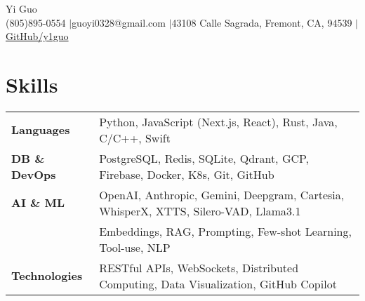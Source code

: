 \documentclass[letterpaper,12pt]{article}
\begin{document}
\newcommand{\name}{Yi Guo}
\newcommand{\phone}{(805)895-0554}
\newcommand{\email}{guoyi0328@gmail.com}
\newcommand{\address}{43108 Calle Sagrada, Fremont, CA, 94539}
\newcommand{\github}{y1guo}
\newcommand{\linkedin}{y1guo}
\newcommand{\website}{https://y1guo.github.io}

\begin{center}
    \Huge \name \\
    \vspace{1pt}
    \small \phone 
    $|$\email
    $|$\address
    $|$\href{https://github.com/\github}{GitHub/\github}
    \vspace{-10pt}
\end{center}





\vspace{-0.9em}
\section{Skills}
\vspace{0.3em}

\begin{tabular}{p{7em} p{38em}}
    \textbf{Languages}
    & Python, JavaScript (Next.js, React), Rust, Java, C/C++, Swift \\
    \textbf{DB \& DevOps}
    & PostgreSQL, Redis, SQLite, Qdrant, GCP, Firebase, Docker, K8s, Git, GitHub \\
    \textbf{AI \& ML}
    & OpenAI, Anthropic, Gemini, Deepgram, Cartesia, WhisperX, XTTS, Silero-VAD, Llama3.1 \\
    & Embeddings, RAG, Prompting, Few-shot Learning, Tool-use, NLP \\
    \textbf{Technologies}
    & RESTful APIs, WebSockets, Distributed Computing, Data Visualization, GitHub Copilot \\
\end{tabular}
\end{document}
